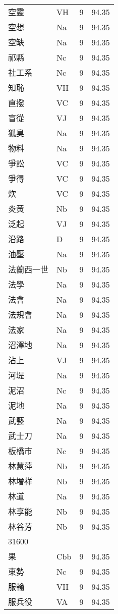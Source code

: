 \documentclass[twocolumn]{book}
\begin{document}
\begin{supertabular}{llrr}
空靈 & VH & 9 &  94.35\\
空想 & Na & 9 &  94.35\\
空缺 & Na & 9 &  94.35\\
祁縣 & Nc & 9 &  94.35\\
社工系 & Nc & 9 &  94.35\\
知恥 & VH & 9 &  94.35\\
直撥 & VC & 9 &  94.35\\
盲從 & VJ & 9 &  94.35\\
狐臭 & Na & 9 &  94.35\\
物料 & Na & 9 &  94.35\\
爭訟 & VC & 9 &  94.35\\
爭得 & VC & 9 &  94.35\\
炊 & VC & 9 &  94.35\\
炎黃 & Nb & 9 &  94.35\\
泛起 & VJ & 9 &  94.35\\
沿路 & D & 9 &  94.35\\
油壓 & Na & 9 &  94.35\\
法蘭西一世 & Nb & 9 &  94.35\\
法學 & Na & 9 &  94.35\\
法會 & Na & 9 &  94.35\\
法規會 & Na & 9 &  94.35\\
法家 & Na & 9 &  94.35\\
沼澤地 & Na & 9 &  94.35\\
沾上 & VJ & 9 &  94.35\\
河堤 & Na & 9 &  94.35\\
泥沼 & Nc & 9 &  94.35\\
泥地 & Na & 9 &  94.35\\
武藝 & Na & 9 &  94.35\\
武士刀 & Na & 9 &  94.35\\
板橋市 & Nc & 9 &  94.35\\
林慧萍 & Nb & 9 &  94.35\\
林增祥 & Nb & 9 &  94.35\\
林道 & Na & 9 &  94.35\\
林享能 & Nb & 9 &  94.35\\
林谷芳 & Nb & 9 &  94.35\\
31600\\
果 & Cbb & 9 &  94.35\\
東勢 & Nc & 9 &  94.35\\
服輸 & VH & 9 &  94.35\\
服兵役 & VA & 9 &  94.35\\

\end{supertabular}
\end{document}
